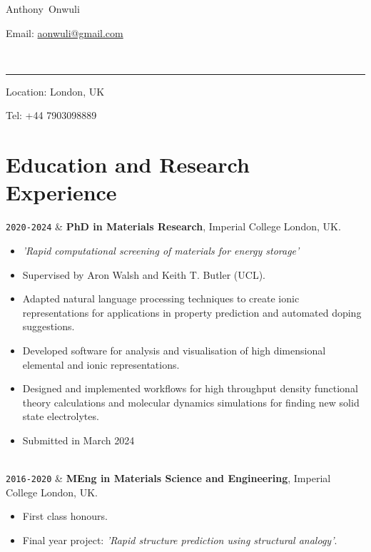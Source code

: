 \documentclass[11pt,a4paper]{article}
\makeatletter
\newcommand{\ICL}{Imperial College London}
\newcommand{\FirstName}{Anthony}
\newcommand{\LastName}{Onwuli}
\newcommand{\MyName}{\FirstName\ \LastName}
\newcommand{\Email}{aonwuli@gmail.com}
\newcommand{\PhoneNumber}{+44 7903098889}
\newcommand{\Duration}[2]{\fontsize{10pt}{0}\selectfont \texttt{#1-#2}}
\makeatother
\begin{document}
\begin{minipage}[t]{0.5\textwidth}
  {\fontsize{20pt}{0}\selectfont\MyName}
\end{minipage}
\begin{minipage}[t]{0.5\textwidth}
  \begin{flushright}
    Email: \href{mailto:\Email}{\Email}
  \end{flushright}
\end{minipage}
\\[-0.1cm]
\textcolor{lightgray}{\rule{\textwidth}{3pt}}
\begin{minipage}[t]{0.5\textwidth}
  Location: {London, UK}
\end{minipage}
\begin{minipage}[t]{0.5\textwidth}
  \begin{flushright}
  Tel: \PhoneNumber{}

  \end{flushright}
\end{minipage}
\vspace{-0.3cm}




\section{Education and Research Experience}

\begin{EntriesTableDuration}
  \Duration{2020}{2024}  &
  \textbf{PhD in Materials Research}, \ICL{}, UK.
  \begin{itemize}
    \item \textit{'Rapid computational screening of materials for energy storage'}
    \item Supervised by Aron Walsh and Keith T. Butler (UCL).
    \item Adapted natural language processing techniques to create ionic representations for applications in property prediction and automated doping suggestions.
    \item Developed software for analysis and visualisation of high dimensional elemental and ionic representations.
    \item Designed and implemented workflows for high throughput density functional theory calculations and molecular dynamics simulations for finding new solid state electrolytes.
    \item Submitted in March 2024
  \end{itemize}
  \\
  \Duration{2016}{2020}  &
  \textbf{MEng in Materials Science and Engineering}, \ICL{}, UK.
  \begin{itemize}
    \item First class honours.
    \item Final year project: \textit{'Rapid structure prediction using structural analogy'}.
  \end{itemize}
\end{EntriesTableDuration}
\end{document}

